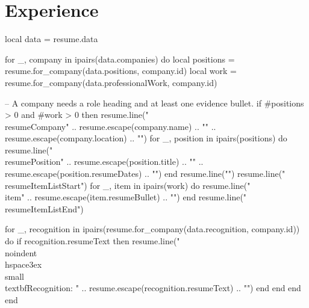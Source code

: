 \section{\textbf{Experience}}
\resumeSubHeadingListStart
\begin{luacode*}
local data = resume.data

for _, company in ipairs(data.companies) do
  local positions = resume.for_company(data.positions, company.id)
  local work = resume.for_company(data.professionalWork, company.id)

  -- A company needs a role heading and at least one evidence bullet.
  if #positions > 0 and #work > 0 then
    resume.line("\\resumeCompany{" .. resume.escape(company.name) .. "}{" .. resume.escape(company.location) .. "}{")
    for _, position in ipairs(positions) do
      resume.line("    \\resumePosition{" .. resume.escape(position.title) .. "}{" .. resume.escape(position.resumeDates) .. "}")
    end
    resume.line("}")
    resume.line("\\resumeItemListStart")
    for _, item in ipairs(work) do
      resume.line("    \\item{" .. resume.escape(item.resumeBullet) .. "}")
    end
    resume.line("\\resumeItemListEnd")

    for _, recognition in ipairs(resume.for_company(data.recognition, company.id)) do
      if recognition.resumeText then
        resume.line("\\noindent\\hspace{3ex}\\small{\\textbf{Recognition:} " .. resume.escape(recognition.resumeText) .. "}")
      end
    end
  end
end
\end{luacode*}
\resumeSubHeadingListEnd
\vspace{-3mm}
